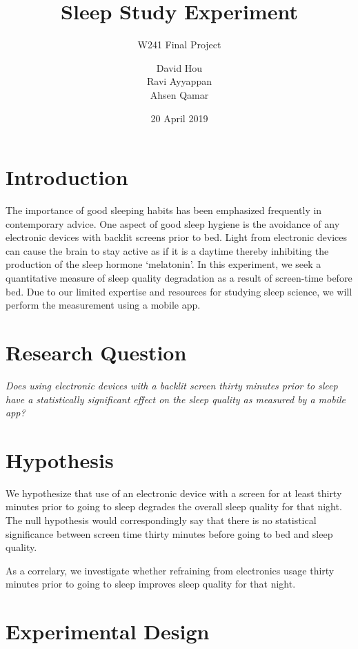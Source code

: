 \documentclass[12pt,]{article}
\title{Sleep Study Experiment}
\subtitle{W241 Final Project}
\author{David Hou \\ Ravi Ayyappan \\ Ahsen Qamar}
\date{20 April 2019}
\begin{document}
\maketitle

\section{Introduction}\label{introduction}

The importance of good sleeping habits has been emphasized frequently in
contemporary advice. One aspect of good sleep hygiene is the avoidance
of any electronic devices with backlit screens prior to bed. Light from
electronic devices can cause the brain to stay active as if it is a
daytime thereby inhibiting the production of the sleep hormone
`melatonin'. In this experiment, we seek a quantitative measure of sleep
quality degradation as a result of screen-time before bed. Due to our
limited expertise and resources for studying sleep science, we will
perform the measurement using a mobile app.

\section{Research Question}\label{research-question}

\emph{Does using electronic devices with a backlit screen thirty minutes
prior to sleep have a statistically significant effect on the sleep
quality as measured by a mobile app?}

\section{Hypothesis}\label{hypothesis}

We hypothesize that use of an electronic device with a screen for at
least thirty minutes prior to going to sleep degrades the overall sleep
quality for that night. The null hypothesis would correspondingly say
that there is no statistical significance between screen time thirty
minutes before going to bed and sleep quality.

As a correlary, we investigate whether refraining from electronics usage
thirty minutes prior to going to sleep improves sleep quality for that
night.

\section{Experimental Design}\label{experimental-design}
\end{document}
